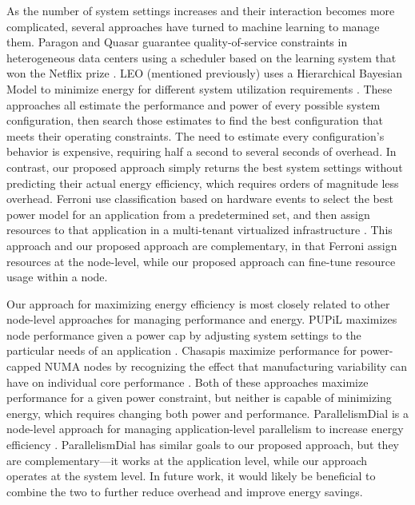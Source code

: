 As the number of system settings increases and their interaction becomes more complicated, several approaches have turned to machine learning to manage them.
Paragon \cite{Paragon} and Quasar \cite{quasar} guarantee quality-of-service constraints in heterogeneous data centers using a scheduler based on the learning system that won the Netflix prize \cite{NetflixPrize}.
LEO (mentioned previously) uses a Hierarchical Bayesian Model to minimize energy for different system utilization requirements \cite{LEO}.
These approaches all estimate the performance and power of every possible system configuration, then search those estimates to find the best configuration that meets their operating constraints.
The need to estimate every configuration's behavior is expensive, requiring half a second \cite{LEO} to several seconds \cite{Paragon} of overhead.
In contrast, our proposed approach simply returns the best system settings without predicting their actual energy efficiency, which requires orders of magnitude less overhead.
Ferroni \etal use classification based on hardware events to select the best power model for an application from a predetermined set, and then assign resources to that application in a multi-tenant virtualized infrastructure \cite{FerroniTACO}.
This approach and our proposed approach are complementary, in that Ferroni \etal assign resources at the node-level, while our proposed approach can fine-tune resource usage within a node.

Our approach for maximizing energy efficiency is most closely related to other node-level approaches for managing performance and energy.
PUPiL maximizes node performance given a power cap by adjusting system settings to the particular needs of an application \cite{pupil}.
Chasapis \etal maximize performance for power-capped NUMA nodes by recognizing the effect that manufacturing variability can have on individual core performance \cite{Chasapis2016}.
Both of these approaches maximize performance for a given power constraint, but neither is capable of minimizing energy, which requires changing both power and performance.
ParallelismDial is a node-level approach for managing application-level parallelism to increase energy efficiency \cite{Sridharan2013}.
ParallelismDial has similar goals to our proposed approach, but they are complementary---it works at the application level, while our approach operates at the system level.
In future work, it would likely be beneficial to combine the two to further reduce overhead and improve energy savings.


